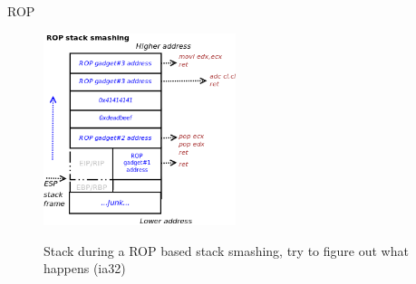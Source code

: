 \begin{frame}{ROP}
\framebreak

	\begin{figure}
        \includegraphics[width=0.5\textwidth]{imgs/rop-stack.png}
        \label{fig:rop-stack}
        \caption{Stack during a ROP based stack smashing, try to figure out what happens (ia32)}
    \end{figure}

\end{frame}
